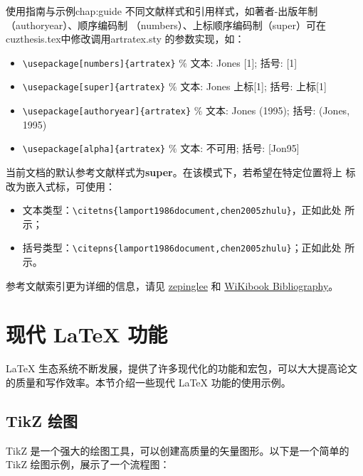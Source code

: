 \begin{cuzchapter}{使用指南与示例}{chap:guide}
    不同文献样式和引用样式，如著者-出版年制（authoryear）、顺序编码制
    （numbers）、上标顺序编码制（super）可在cuzthesis.tex中修改调用artratex.sty
    的参数实现，如：
    \begin{itemize}
        \item \verb+\usepackage[numbers]{artratex}+ $\%$ 文本: Jones [1]; 括号: [1]
        \item \verb+\usepackage[super]{artratex}+ $\%$ 文本: Jones 上标[1]; 括号: 上标[1]
        \item \verb+\usepackage[authoryear]{artratex}+ $\%$ 文本: Jones (1995); 括号: (Jones, 1995)
        \item \verb+\usepackage[alpha]{artratex}+ $\%$ 文本: 不可用; 括号: [Jon95]
    \end{itemize}

    当前文档的默认参考文献样式为\textbf{super}。在该模式下，若希望在特定位置将上
    标改为嵌入式标，可使用：

    \begin{itemize}
        \item 文本类型：\verb|\citetns{lamport1986document,chen2005zhulu}|，正如此处
              所示；
        \item 括号类型：\verb|\citepns{lamport1986document,chen2005zhulu}|；正如此处
              所示。
    \end{itemize}

    参考文献索引更为详细的信息，请见
    \href{https://github.com/zepinglee/gbt7714-bibtex-style}{zepinglee} 和
    \href{https://en.wikibooks.org/wiki/LaTeX/Bibliography_Management}{WiKibook
        Bibliography}。


    \section{现代 LaTeX 功能}\label{sec:modern-latex}

    LaTeX 生态系统不断发展，提供了许多现代化的功能和宏包，可以大大提高论文的质量和写作效率。本节介绍一些现代 LaTeX 功能的使用示例。

    \subsection{TikZ 绘图}\label{sub:tikz}

    TikZ 是一个强大的绘图工具，可以创建高质量的矢量图形。以下是一个简单的 TikZ 绘图示例，展示了一个流程图：


\end{cuzchapter}
